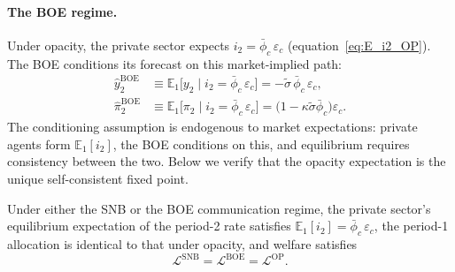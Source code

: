 \paragraph{The BOE regime.}
Under opacity, the private sector expects $i_2 = \bar{\phi}_c\,\varepsilon_c$
(equation~\eqref{eq:E_i2_OP}). The BOE conditions its forecast on this
market-implied path:
\begin{align}
  \hat{y}_2^{\mathrm{BOE}}  &\equiv \mathbb{E}_1\bigl[y_2 \mid i_2 =
    \bar{\phi}_c\,\varepsilon_c\bigr]
    = -\tilde{\sigma}\,\bar{\phi}_c\,\varepsilon_c, \label{eq:y2hat_BOE}\\
  \hat{\pi}_2^{\mathrm{BOE}} &\equiv \mathbb{E}_1\bigl[\pi_2 \mid i_2 =
    \bar{\phi}_c\,\varepsilon_c\bigr]
    = \bigl(1 - \kappa\tilde{\sigma}\bar{\phi}_c\bigr)\varepsilon_c.
    \label{eq:pi2hat_BOE}
\end{align}
The conditioning assumption is endogenous to market expectations: private agents
form $\mathbb{E}_1[i_2]$, the BOE conditions on this, and equilibrium requires
consistency between the two. Below we verify that the opacity expectation is the
unique self-consistent fixed point.

\begin{proposition}
\label{prop:intermediate}
Under either the SNB or the BOE communication regime, the private sector's
equilibrium expectation of the period-2 rate satisfies
$\mathbb{E}_1[i_2] = \bar{\phi}_c\,\varepsilon_c$, the period-1 allocation is
identical to that under opacity, and welfare satisfies
\begin{equation}
  \mathcal{L}^{\mathrm{SNB}} = \mathcal{L}^{\mathrm{BOE}} = \mathcal{L}^{\mathrm{OP}}.
  \label{eq:intermediate_welfare}
\end{equation}
\end{proposition}

